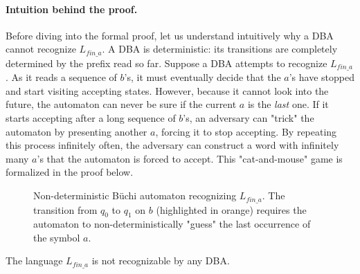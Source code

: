 \paragraph{Intuition behind the proof.}
Before diving into the formal proof, let us understand intuitively why a DBA cannot recognize $L_{fin\_a}$. A DBA is deterministic: its transitions are completely determined by the prefix read so far. Suppose a DBA attempts to recognize $L_{fin\_a}$. As it reads a sequence of $b$'s, it must eventually decide that the $a$'s have stopped and start visiting accepting states. However, because it cannot look into the future, the automaton can never be sure if the current $a$ is the \emph{last} one. If it starts accepting after a long sequence of $b$'s, an adversary can "trick" the automaton by presenting another $a$, forcing it to stop accepting. By repeating this process infinitely often, the adversary can construct a word with infinitely many $a$'s that the automaton is forced to accept. This "cat-and-mouse" game is formalized in the proof below.

\begin{figure}[H]
\centering
{}
\caption{Non-deterministic Büchi automaton recognizing $L_{fin\_a}$. The transition from $q_0$ to $q_1$ on $b$ (highlighted in orange) requires the automaton to non-deterministically "guess" the last occurrence of the symbol $a$.}
\label{fig:nba-fin-a}
\end{figure}

\begin{theorem}
The language $L_{fin\_a}$ is not recognizable by any DBA.
\end{theorem}

